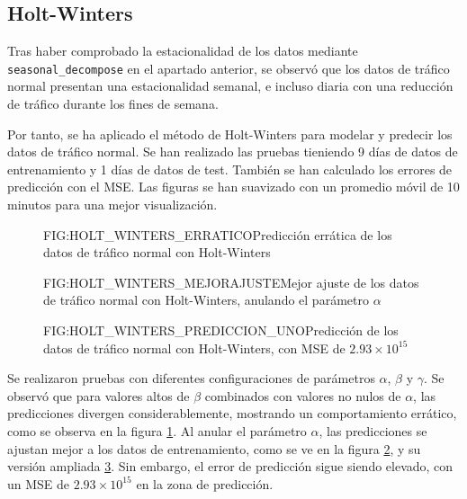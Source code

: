 \subsection{Holt-Winters}

Tras haber comprobado la estacionalidad de los datos mediante \texttt{seasonal\_decompose} en el apartado anterior, se observó que los datos de tráfico normal presentan una estacionalidad semanal, e incluso diaria con una reducción de tráfico durante los fines de semana.

Por tanto, se ha aplicado el método de Holt-Winters para modelar y predecir los datos de tráfico normal. Se han realizado las pruebas tieniendo 9 días de datos de entrenamiento y 1 días de datos de test. También se han calculado los errores de predicción con el \ac{MSE}. Las figuras se han suavizado con un promedio móvil de 10 minutos para una mejor visualización.

\begin{figure}[Predicción errática de los datos de tráfico normal con Holt-Winters]{FIG:HOLT_WINTERS_ERRATICO}{Predicción errática de los datos de tráfico normal con Holt-Winters}
    \label{FIG:HOLT_WINTERS_ERRATICO}
\end{figure}

\begin{figure}[Mejor ajuste de los datos de tráfico normal con Holt-Winters, anulando el parámetro $\alpha$]{FIG:HOLT_WINTERS_MEJORAJUSTE}{Mejor ajuste de los datos de tráfico normal con Holt-Winters, anulando el parámetro $\alpha$}
    \label{FIG:HOLT_WINTERS_MEJORAJUSTE}
\end{figure}

\begin{figure}[Predicción de los datos de tráfico normal con Holt-Winters, con MSE de $2.93\times 10^{15}$]{FIG:HOLT_WINTERS_PREDICCION_UNO}{Predicción de los datos de tráfico normal con Holt-Winters, con MSE de $2.93\times 10^{15}$}
    \label{FIG:HOLT_WINTERS_PREDICCION_UNO}
\end{figure}

Se realizaron pruebas con diferentes configuraciones de parámetros $\alpha$, $\beta$ y $\gamma$. Se observó que para valores altos de $\beta$ combinados con valores no nulos de $\alpha$, las predicciones divergen considerablemente, mostrando un comportamiento errático, como se observa en la figura \ref{FIG:HOLT_WINTERS_ERRATICO}. Al anular el parámetro $\alpha$, las predicciones se ajustan mejor a los datos de entrenamiento, como se ve en la figura \ref{FIG:HOLT_WINTERS_MEJORAJUSTE}, y su versión ampliada \ref{FIG:HOLT_WINTERS_PREDICCION_UNO}. Sin embargo, el error de predicción sigue siendo elevado, con un \ac{MSE} de $2.93\times 10^{15}$ en la zona de predicción.

